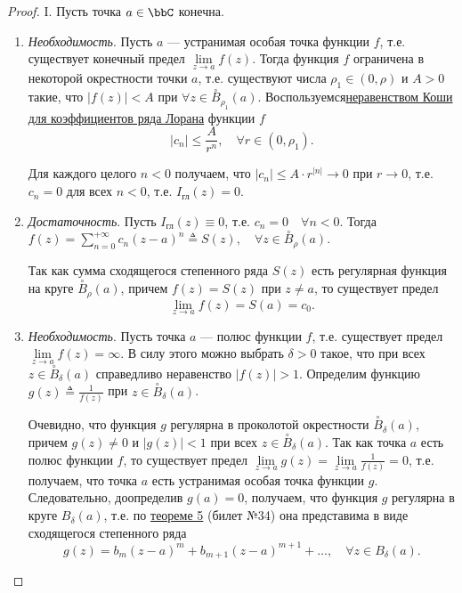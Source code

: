 \begin{proof}

I. Пусть точка $a \in \bbC$ конечна.

\begin{enumerate}

\item \textit{Необходимость}. Пусть $a$ --- устранимая особая точка функции $f$, т.е. существует конечный предел $\lim\limits_{z \to a} f(z)$. Тогда функция $f$ ограничена в некоторой окрестности точки $a$, т.е. существуют числа $\rho_1 \in (0, \rho)$ и $A > 0$ такие, что $|f(z)| < A$ при $\forall z \in \overset{\circ}{B}_{\rho_1}(a)$. Воспользуемся\hyperref[ch35.1cons3]{неравенством Коши для коэффициентов ряда Лорана} функции $f$
$$
|c_n| \le \frac{A}{r^n}, \quad \forall r \in (0, \rho_1).
$$

Для каждого целого $n < 0$ получаем, что $|c_n| \le A \cdot r^{|n|} \to 0$ при $r \to 0$, т.е. $c_n = 0$ для всех $n < 0$, т.е. $I_{\text{гл}}(z) = 0$.

\item \textit{Достаточность}. Пусть $I_{\text{гл}}(z) \equiv 0$, т.е. $c_n = 0 \quad \forall n < 0$. Тогда $f(z) = \sum\limits_{n = 0}^{+\infty} c_n (z - a)^n \triangleq S(z), \quad \forall z \in \overset{\circ}{B}_{\rho}(a)$.

Так как сумма сходящегося степенного ряда $S(z)$ есть регулярная функция на круге $\overset{\circ}{B}_{\rho}(a)$, причем $f(z) = S(z)$ при $z \not= a$, то существует предел
$$
\lim_{z \to a} f(z) = S(a) = c_0.
$$

\item \textit{Необходимость}. Пусть точка $a$ --- полюс функции $f$, т.е. существует предел $\lim\limits_{z \to a} f(z) = \infty$. В силу этого можно выбрать $\delta > 0$ такое, что при всех $z \in \overset{\circ}{B}_{\delta}(a)$ справедливо неравенство $|f(z)| > 1$. Определим функцию $g(z)\triangleq\frac{1}{f(z)}$ при $z \in \overset{\circ}{B}_{\delta}(a)$.

Очевидно, что функция $g$ регулярна в проколотой окрестности $\overset{\circ}{B}_{\delta}(a)$, причем $g(z) \not= 0$ и $|g(z)| < 1$ при всех $z \in \overset{\circ}{B}_{\delta}(a)$. Так как точка $a$ есть полюс функции $f$, то существует предел $\lim\limits_{z \to a} g(z) = \lim\limits_{z \to a} \frac{1}{f(z)} = 0$, т.е. получаем, что точка $a$ есть устранимая особая точка функции $g$. Следовательно, доопределив $g(a) = 0$, получаем, что функция $g$ регулярна в круге $B_{\delta}(a)$, т.е. по \hyperref[abc29]{теореме 5} (билет №34) она представима в виде сходящегося степенного ряда
\begin{equation} \label{ch35.2eq3}
g(z) = b_m (z - a)^m + b_{m + 1} (z - a)^{m + 1} + \ldots, \quad \forall z \in B_\delta(a).
\end{equation}


\end{enumerate}
\end{proof}
